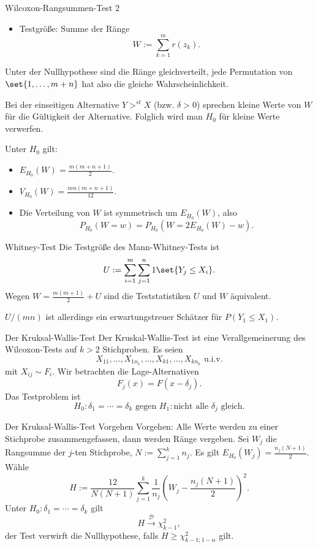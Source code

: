 \begin{karte}{Wilcoxon-Rangsummen-Test 2}
\begin{itemize}
    \item Testgröße: Summe der Ränge 
    \[ W := \sum_{k=1}^m r(z_k). \]
\end{itemize}
Unter der Nullhypothese sind die Ränge gleichverteilt, jede Permutation von 
\(\set{1, \ldots, m+n}\) hat also die gleiche Wahrscheinlichkeit. 

Bei der einseitigen Alternative \(Y >^{st} X\) (bzw. \(\delta > 0\)) sprechen kleine 
Werte von \(W\) für die Gültigkeit der Alternative. Folglich wird man \(H_0\) für 
kleine Werte verwerfen. 

Unter \(H_0\) gilt: 
\begin{itemize}
    \item \(E_{H_0}(W) = \frac{m(m+n+1)}{2}\).
    \item \(V_{H_0}(W) = \frac{mn(m+n+1)}{12}\).
    \item Die Verteilung von \(W\) ist symmetrisch um \(E_{H_0}(W)\), also 
    \[ P_{H_0}(W=w) = P_{H_0}(W=2 E_{H_0}(W) - w). \]
\end{itemize}
\end{karte}

\begin{karte}{Whitney-Test}
Die Testgröße des Mann-Whitney-Tests ist 
\[ U := \sum_{i=1}^m \sum_{j=1}^n 1\set{Y_j \leq X_i}. \]
Wegen \(W = \frac{m(m+1)}{2} + U\)
sind die Teststatistiken \(U\) und \(W\) äquivalent. 

\(U/(mn)\) ist allerdings ein erwartungstreuer Schätzer für \(P(Y_1 \leq X_1)\).
\end{karte}

\begin{karte}{Der Kruksal-Wallis-Test}
Der Kruskal-Wallis-Test ist eine Verallgemeinerung des Wilcoxon-Tests auf \(k>2\) 
Stichproben. Es seien 
\[ X_{11}, \ldots, X_{1 n_1}, \ldots, X_{k1}, \ldots, X_{k n_k} \text{ u.i.v.} \]
mit \(X_{ij} \sim F_i\).
Wir betrachten die Lage-Alternativen 
\[ F_j(x) = F(x - \delta_j). \]
Das Testproblem ist 
\[ H_0: \delta_1 = \cdots = \delta_k \text{ gegen } H_1: \text{nicht alle }\delta_j \text{ gleich.} \]
\end{karte}

\begin{karte}{Der Kruksal-Wallis-Test Vorgehen}
Vorgehen: Alle Werte werden zu einer Stichprobe zusammengefassen, dann werden Ränge vergeben. 
Sei \(W_j\) die Rangsumme der \(j\)-ten Stichprobe, \(N := \sum_{j=1}^k n_j\). 
Es gilt \(E_{H_0}(W_j) = \frac{n_j(N+1)}{2}\). 
Wähle 
\[ H := \frac{12}{N(N+1)} \sum_{j=1}^k \frac{1}{n_j} \left( W_j - \frac{n_j (N+1)}{2} \right)^2. \]
Unter \(H_0: \delta_1 = \cdots = \delta_k\) gilt
\[ H \overset{\mathcal{D}}{\longrightarrow} \chi_{k-1}^2, \]
der Test verwirft die Nullhypothese, falls \(H\geq \chi_{k-1;1-\alpha}^2\) gilt.
\end{karte}

